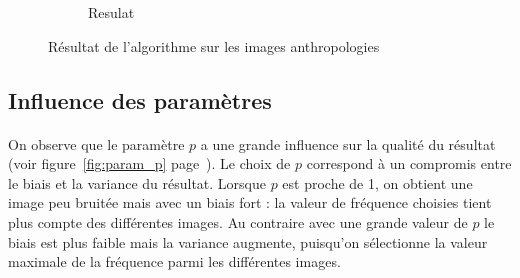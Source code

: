 \documentclass[a4paper,10pt]{report}
\begin{document}
\begin{figure}[h]
\begin{subfigure}{0.32\textwidth}
    \caption{Resulat}
    \label{fig:fire_result}
  \end{subfigure}
  
  \caption{Résultat de l'algorithme sur les images anthropologies}
\label{fig:anthro}
\end{figure}


\subsection{Influence des paramètres}
\paragraph{}
On observe que le paramètre \(p\) a une grande influence sur la qualité du résultat (voir
figure~\ref{fig:param_p} page~\pageref{fig:param_p}).
Le choix de \(p\) correspond à un compromis entre le biais et la variance du résultat. 
Lorsque \(p\) est proche de 1, on obtient une image peu bruitée mais avec un biais fort : la valeur 
de fréquence choisies tient plus compte des différentes images.
Au contraire avec une grande valeur de \(p\) le biais est plus faible mais la variance augmente,
puisqu'on sélectionne la valeur maximale de la fréquence parmi les différentes images.
\end{document}
